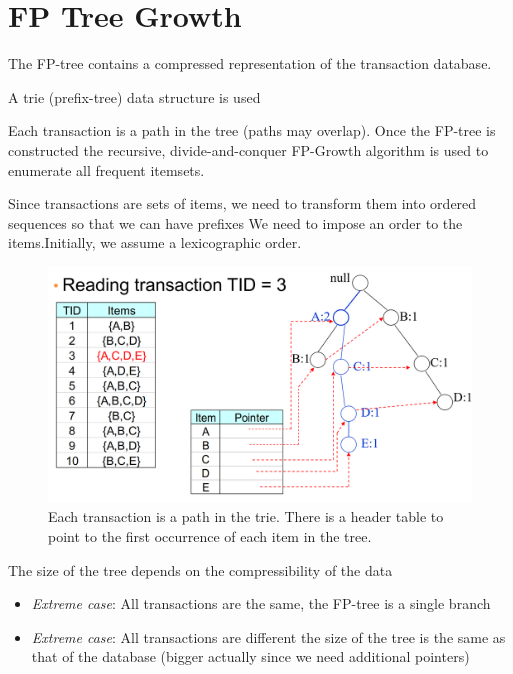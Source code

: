 \section{FP Tree Growth}

The FP-tree contains a compressed
representation of the transaction database.

A trie (prefix-tree) data structure is used

Each transaction is a path in the tree (paths may overlap).
Once the FP-tree is constructed the recursive, divide-and-conquer FP-Growth algorithm is used to enumerate all frequent itemsets.

Since transactions are sets of items, we
need to transform them into ordered
sequences so that we can have
prefixes
We need to impose an order to the items.Initially, we assume a lexicographic order.

\begin{figure}[htbp]
   \centering
   \includegraphics{images/08/trie1.png}
   \caption{Each transaction is a path in the trie. There is a header table to point to the first occurrence of each item in the tree.}
   \label{fig:08/trie1}
\end{figure}

The size of the tree depends on the compressibility
of the data
\begin{itemize}
	\item \textit{Extreme case}: All transactions are the same, the FP-tree is a single branch
	\item \textit{Extreme case}: All transactions are different the size of the tree is the same as that of the database (bigger actually since we need additional pointers)
\end{itemize}

